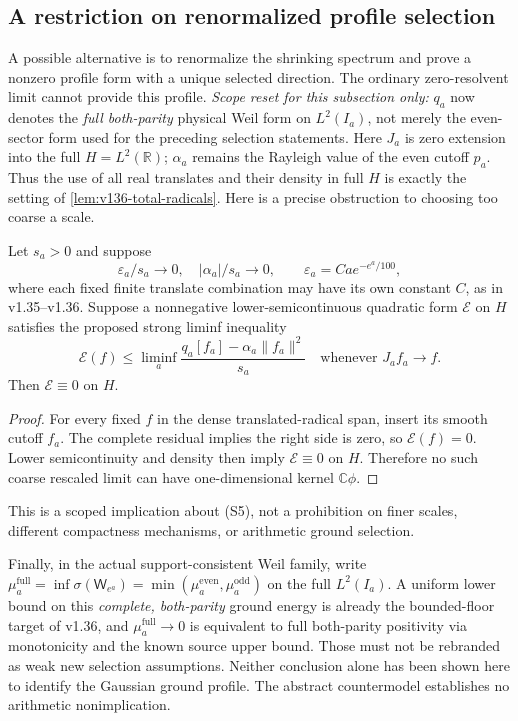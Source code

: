\subsection*{A restriction on renormalized profile selection}

A possible alternative is to renormalize the shrinking spectrum and
prove a nonzero profile form with a unique selected direction.
The ordinary zero-resolvent limit cannot provide this profile.
\emph{Scope reset for this subsection only:} $q_a$ now denotes the
\emph{full both-parity} physical Weil form on $L^2(I_a)$, not merely
the even-sector form used for the preceding selection statements.
Here $J_a$ is zero extension into the full $H=L^2(\mathbb R)$;
$\alpha_a$ remains the Rayleigh value of the even cutoff $p_a$.
Thus the use of all real translates and their density in full $H$
is exactly the setting of \ref{lem:v136-total-radicals}.
Here is a precise obstruction to choosing too coarse a scale.
\begin{proposition}
\label{prop:ns43-ccm-coarse-profile}
Let $s_a>0$ and suppose
\[
 \varepsilon_a/s_a\to0,\quad |\alpha_a|/s_a\to0,
 \qquad \varepsilon_a=Ca e^{-e^a/100},
\]
where each fixed finite translate combination may have its own constant
$C$, as in v1.35--v1.36. Suppose a nonnegative lower-semicontinuous
quadratic form $\mathcal E$ on $H$ satisfies the proposed strong
liminf inequality
\[
 \mathcal E(f)\le\liminf_a
 \frac{q_a[f_a]-\alpha_a\|f_a\|^2}{s_a}
 \quad\text{whenever }J_af_a\to f.
 \tag{S5}
\]
Then $\mathcal E\equiv0$ on $H$.
\end{proposition}
\begin{proof}
For every fixed $f$ in the dense translated-radical span, insert its
smooth cutoff $f_a$. The complete residual implies the right side is
zero, so $\mathcal E(f)=0$. Lower semicontinuity and density then imply
$\mathcal E\equiv0$ on $H$. Therefore no such coarse rescaled limit
can have one-dimensional kernel $\mathbb C\phi$.
\end{proof}
This is a scoped implication about (S5), not a prohibition on finer
scales, different compactness mechanisms, or arithmetic ground selection.

Finally, in the actual support-consistent Weil family, write
$\mu_a^{\mathrm{full}}=\inf\sigma(\mathsf W_{e^a})
=\min(\mu_a^{\mathrm{even}},\mu_a^{\mathrm{odd}})$ on the full
$L^2(I_a)$. A uniform lower bound on this \emph{complete, both-parity}
ground energy is already the bounded-floor
target of v1.36, and $\mu_a^{\mathrm{full}}\to0$ is equivalent to
full both-parity positivity
via monotonicity and the known source upper bound. Those must not be
rebranded as weak new selection assumptions. Neither conclusion alone
has been shown here to identify the Gaussian ground profile. The
abstract countermodel establishes no arithmetic nonimplication.

